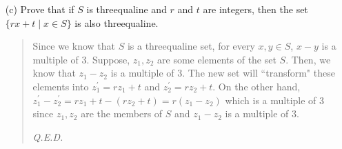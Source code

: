 \documentclass[12pt, a4paper]{article}                      %
\begin{document}
\begin{itemize}
\begin{itemize}
\item[(c)]
Prove that if $S$ is threequaline and $r$ and $t$ are integers, then the set $\{rx + t \mid x \in S\}$ is also threequaline.
\begin{quote}
Since we know that $S$ is a threequaline set, for every $x, y \in S$, $x - y$ is a multiple of 3. Suppose, $z_1, z_2$ are some elements of the set $S$.
Then, we know that $z_1 - z_2$ is a multiple of 3. The new set will ``transform" these elements into $z_1^{'} = rz_1 + t$ and $z_2^{'} = rz_2 + t$.
On the other hand, $z_1^{'} - z_2^{'} = rz_1 + t - (rz_2 + t) = r(z_1 - z_2)$ which is a multiple of 3 since $z_1, z_2$ are the members of $S$ and
$z_1 - z_2$ is a multiple of 3.
\begin{flushright}
\textit{Q.E.D.}
\end{flushright}
\end{quote}

\item[]


\end{itemize}
\end{itemize}
\end{document}
